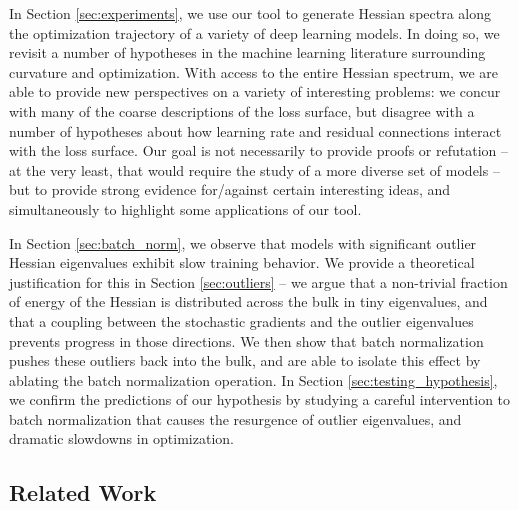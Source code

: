 \documentclass{article}
\begin{document}
In Section \ref{sec:experiments}, we use our tool to generate Hessian spectra along the optimization trajectory of a variety of deep learning models. In doing so, we revisit a number of hypotheses in the machine learning literature surrounding curvature and optimization. With access to the entire Hessian spectrum, we are able to provide new perspectives on a variety of interesting problems: we concur with many of the coarse descriptions of the loss surface, but disagree with a number of hypotheses about how learning rate and residual connections interact with the loss surface. Our goal is not necessarily to provide proofs or refutation -- at the very least, that would require the study of a more diverse set of models -- but to provide strong evidence for/against certain interesting ideas, and simultaneously to highlight some applications of our tool.

In Section \ref{sec:batch_norm}, we observe that models with significant outlier Hessian eigenvalues exhibit slow training behavior. We provide a theoretical justification for this in Section \ref{sec:outliers} -- we argue that a non-trivial fraction of energy of the Hessian is distributed across the bulk in tiny eigenvalues, and that a coupling between the stochastic gradients and the outlier eigenvalues prevents progress in those directions. We then show that batch normalization pushes these outliers back into the bulk, and are able to isolate this effect by ablating the batch normalization operation. In Section \ref{sec:testing_hypothesis}, we confirm the predictions of our hypothesis by studying a careful intervention to batch normalization that causes the resurgence of outlier eigenvalues, and dramatic slowdowns in optimization.

\subsection{Related Work}
\label{sec:related_work}
\end{document}

